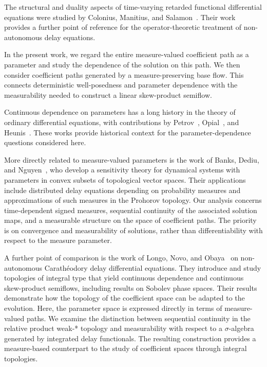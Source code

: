 \documentclass[reqno]{amsart}
\theoremstyle{plain}
\numberwithin{equation}{section}
\numberwithin{definition}{section}
\begin{document}
The structural and duality aspects of time-varying retarded
functional differential equations were studied by Colonius,
Manitius, and Salamon~\cite{ColoniusManitiusSalamon1989}.
Their work provides a further point of reference for the
operator-theoretic treatment of non-autonomous delay equations.

In the present work, we regard the entire measure-valued
coefficient path as a parameter and study the dependence
of the solution on this path. We then consider coefficient
paths generated by a measure-preserving base flow.
This connects deterministic well-posedness and parameter
dependence with the measurability needed to construct
a linear skew-product semiflow.

Continuous dependence on parameters has a long history
in the theory of ordinary differential equations, with
contributions by Petrov~\cite{Petrov1962,Petrov1964},
Opial~\cite{Opial1967}, and Heunis~\cite{Heunis1984}.
These works provide historical context for the
parameter-dependence questions considered here.

More directly related to measure-valued parameters is the
work of Banks, Dediu, and Nguyen~\cite{BanksDediuNguyen2007},
who develop a sensitivity theory for dynamical systems
with parameters in convex subsets of topological vector spaces.
Their applications include distributed delay equations
depending on probability measures and approximations of
such measures in the Prohorov topology.
Our analysis concerns time-dependent signed measures,
sequential continuity of the associated solution maps,
and a measurable structure on the space of coefficient paths.
The priority is on convergence and measurability of solutions,
rather than differentiability with respect to the measure
parameter.

A further point of comparison is the work of Longo, Novo,
and Obaya~\cite{LongoNovoObaya2019} on non-autonomous
Carath\'eodory delay differential equations.
They introduce and study topologies of integral type
that yield continuous dependence and continuous
skew-product semiflows, including results on Sobolev
phase spaces. Their results demonstrate how the topology
of the coefficient space can be adapted to the evolution.
Here, the parameter space is expressed directly in terms
of measure-valued paths. We examine the distinction between
sequential continuity in the relative product weak-*
topology and measurability with respect to a
$\sigma$-algebra generated by integrated delay functionals.
The resulting construction provides a measure-based
counterpart to the study of coefficient spaces through
integral topologies.
\end{document}
